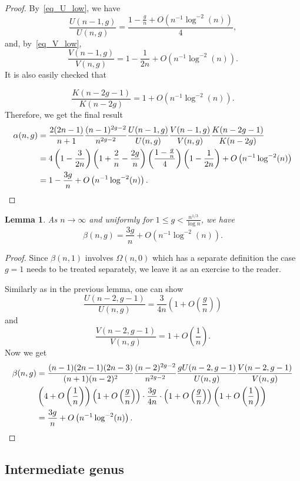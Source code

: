 \documentclass[a4paper,12pt]{article}
\newtheorem{lemma}[theorem]{Lemma}
\theoremstyle{definition}
\newcommand{\bigO}[1]{O\left({#1}\right)}
\newcommand{\err}{\bigO{n^{-1}\log^{-2}(n)}}
\newcommand{\bigpar}[1]{\left({#1}\right)}
\begin{document}
\begin{proof}
By~\eqref{eq_U_low}, we have
\[\frac{U(n-1,g)}{U(n,g)}=\frac{1-\frac{g}{n}+\err}{4},\]
and, by~\eqref{eq_V_low},
\[\frac{V(n-1,g)}{V(n,g)}=1-\frac{1}{2n}+\err.\]
It is also easily checked that

\[\frac{K(n-2g-1)}{ K(n-2g)}=1+\err. \]
Therefore, we get the final result
\begin{align*}
    \alpha(n,g)&=\frac{2(2n-1)}{n+1}\frac{(n-1)^{2g-2}}{n^{2g-2}}\frac{U(n-1,g)}{U(n,g)}\frac{V(n-1,g)}{V(n,g)}\frac{K(n-2g-1)}{ K(n-2g)}\\
    &=4\bigpar{1-\frac{3}{2n}}\bigpar{1+\frac{2}{n}-\frac{2g}{n}}\bigpar{\frac{1-\frac{g}{n}}{4}}\bigpar{1-\frac{1}{2n}}+\err\\
    &=1-\frac{3g}{n}+\err. \qedhere
\end{align*}
\end{proof}

\begin{lemma}
    As $n\to\infty$ and uniformly for $1\leq g<\frac{n^{1/3}}{\log n}$, we have
    \[\beta(n,g)=\frac{3g}{n}+\err.\]
\end{lemma}

\begin{proof}
Since $\beta(n,1)$ involves $\Omega(n,0)$ which has a separate definition the case $g=1$ needs to be treated separately, we leave it as an exercise to the reader.

Similarly as in the previous lemma, one can show 
\[\frac{U(n-2,g-1)}{U(n,g)}=\frac{3}{4n}\bigpar{1+\bigO{\frac{g}{n}}}\]
and
\[\frac{V(n-2,g-1)}{V(n,g)}=1+\bigO{\frac{1}{n}}.\]
Now we get
\begin{align*}
    \beta(n,g)&=\frac{(n-1)(2n-1)(2n-3)}{(n+1)(n-2)^2}\frac{(n-2)^{2g-2}}{n^{2g-2}}\frac{gU(n-2,g-1)}{U(n,g)}\frac{V(n-2,g-1)}{V(n,g)}\\
    &\bigpar{4+\bigO{\frac{1}{n}}}\bigpar{1+\bigO{\frac{g}{n}}}\cdot\frac{3g}{4n}\cdot\bigpar{1+\bigO{\frac{g}{n}}}\bigpar{1+\bigO{\frac{1}{n}}}\\
    &=\frac{3g}{n}+\err. \qedhere
\end{align*}
\end{proof}







\subsection{Intermediate genus}\label{sec:intermediate_genus}
\end{document}
